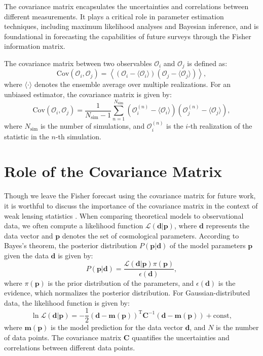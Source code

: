 The covariance matrix encapsulates the uncertainties and correlations between different measurements. It plays a critical role in parameter estimation techniques, including maximum likelihood analyses and Bayesian inference, and is foundational in forecasting the capabilities of future surveys through the Fisher information matrix.

The covariance matrix between two observables $\mathcal{O}_i$ and $\mathcal{O}_j$ is defined as:
\begin{equation}
    \mathrm{Cov}(\mathcal{O}_i, \mathcal{O}_j) = \left\langle (\mathcal{O}_i - \langle \mathcal{O}_i \rangle)(\mathcal{O}_j - \langle \mathcal{O}_j \rangle) \right\rangle,
\end{equation}
where $\langle \cdot \rangle$ denotes the ensemble average over multiple realizations.
For an unbiased estimator, the covariance matrix is given by:
\begin{equation}
    \label{eq:covariance}
    \mathrm{Cov}(\mathcal{O}_i, \mathcal{O}_j) = \frac{1}{N_{\mathrm{sim}} - 1} \sum_{n=1}^{N_{\mathrm{sim}}} (\mathcal{O}_i^{(n)} - \langle \mathcal{O}_i \rangle) (\mathcal{O}_j^{(n)} - \langle \mathcal{O}_j \rangle),
\end{equation}
where \( N_{\mathrm{sim}} \) is the number of simulations, and \( \mathcal{O}_i^{(n)} \) is the \( i \)-th realization of the statistic in the \( n \)-th simulation.

\section{Role of the Covariance Matrix}
Though we leave the Fisher forecast using the covariance matrix for future work, it is worthful to discuss the importance of the covariance matrix in the context of weak lensing statistics \citep{2004MNRAS.348..897T, 2005A&A...442...69K}. When comparing theoretical models to observational data, we often compute a likelihood function $\mathcal{L}(\mathbf{d} | \mathbf{p})$, where $\mathbf{d}$ represents the data vector and $\mathbf{p}$ denotes the set of cosmological parameters. 
According to Bayes's theorem, the posterior distribution $P(\mathbf{p} | \mathbf{d})$ of the model parameters $\mathbf{p}$ given the data $\mathbf{d}$ is given by:
\begin{equation}
    P(\mathbf{p} | \mathbf{d}) = \frac{\mathcal{L}(\mathbf{d} | \mathbf{p}) \pi(\mathbf{p})}{\mathbf{\mathcal{\epsilon}}(\mathbf{d})},
\end{equation}
where $\pi(\mathbf{p})$ is the prior distribution of the parameters, and $\mathbf{\mathcal{\epsilon}}(\mathbf{d})$ is the evidence, which normalizes the posterior distribution. 
For Gaussian-distributed data, the likelihood function is given by:
\begin{equation}
    \ln \mathcal{L}(\mathbf{d} | \mathbf{p}) = -\frac{1}{2}(\mathbf{d} - \mathbf{m}(\mathbf{p}))^{\mathrm{T}} \mathbf{C}^{-1} (\mathbf{d} - \mathbf{m}(\mathbf{p})) + \mathrm{const},
\end{equation}
where $\mathbf{m}(\mathbf{p})$ is the model prediction for the data vector $\mathbf{d}$, and $N$ is the number of data points. The covariance matrix $\mathbf{C}$ quantifies the uncertainties and correlations between different data points.

